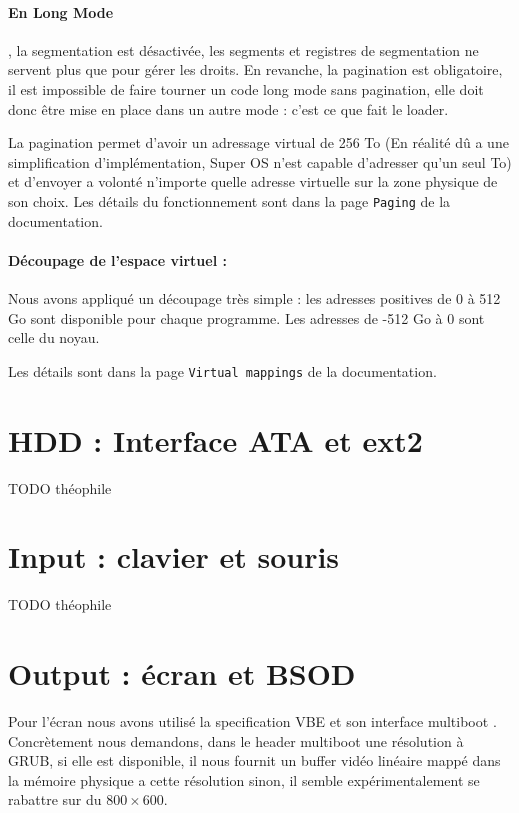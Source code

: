 \documentclass[12pt]{report}
\begin{document}
\paragraph{En Long Mode}, la segmentation est désactivée, les segments et registres de
segmentation ne servent plus que pour gérer les droits.
En revanche, la pagination est obligatoire, il est impossible de faire tourner
un code long mode sans pagination, elle doit donc être mise en place dans un
autre mode : c'est ce que fait le loader.

La pagination permet d'avoir un adressage virtual de 256 To (En réalité dû a une
simplification d'implémentation, Super OS n'est capable d'adresser qu'un seul
To) et d'envoyer a volonté n'importe quelle adresse virtuelle sur la zone
physique de son choix.
Les détails du fonctionnement sont dans la page \verb$Paging$ de la
documentation.

\paragraph{Découpage de l'espace virtuel :} Nous avons appliqué un découpage
très simple : les adresses positives de 0 à 512 Go sont disponible pour chaque
programme. Les adresses de -512 Go à 0 sont celle du noyau.

Les détails sont dans la page \verb$Virtual mappings$ de la documentation.

\section{HDD : Interface ATA et ext2}

TODO théophile

\section{Input : clavier et souris}

TODO théophile

\section{Output : écran et BSOD}

Pour l'écran nous avons utilisé la specification VBE \cite{specVBE} et son
interface multiboot \cite{multiboot}.
Concrètement nous demandons, dans le header multiboot une résolution à GRUB, si
elle est disponible, il nous fournit un buffer vidéo linéaire mappé dans la
mémoire physique a cette résolution sinon, il semble expérimentalement se
rabattre sur du $800 \times 600$.
\end{document}
